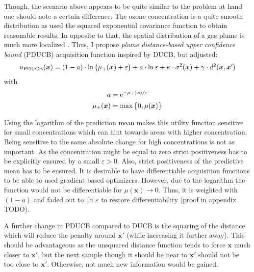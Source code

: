 \documentclass[11pt,a4paper,twoside,BCOR=15mm]{scrreprt}
\newcommand{\vc}[1]{\bm{#1}}
\newcommand{\e}{\mathrm{e}}
\newcommand{\ped}[1]{_{\mathrm{#1}}}
\newcommand{\newterm}[1]{\emph{#1}}
\begin{document}
Though, the scenario above appears to be quite similar to the problem at hand 
one should note a certain difference. The ozone concentration is a quite smooth 
distribution as \textcite{Marchant:2012wb} used the squared exponential 
covariance function to obtain reasonable results. In opposite to that, the 
spatial distribution of a gas plume is much more localized \parencite[][this was 
also noted by]{Stachniss:2008vz}. Thus, I propose \newterm{plume distance-based 
    upper confidence bound} (PDUCB) acquisition function inspired by DUCB, but 
adjusted:
\begin{equation}
    u\ped{PDUCB}(\vc x) = \del{1 - a} \cdot \ln\del{\mu_+(\vc x) + \varepsilon} 
    + a \cdot \ln \varepsilon + \kappa \cdot \sigma^2(\vc x) + \gamma \cdot 
    d^2(\vc x, \vc x')
\end{equation}
with
\begin{align}
    a &= \e^{-\mu_+(\vc x) / \varepsilon} \\
    \mu_+(\vc x) &= \max\cbr{0, \mu(\vc x)}
\end{align}

Using the logarithm of the prediction mean makes this utility function sensitive 
for small concentrations which can hint towards areas with higher concentration.  
Being sensitive to the same absolute change for high concentrations is not as 
important. As the concentration might be equal to zero strict positiveness has 
to be explicitly ensured by a small $\varepsilon > 0$. Also, strict positiveness 
of the predictive mean has to be ensured. It is desirable to have differentiable 
acquisition functions to be able to used gradient based optimizers. However, due 
to the logarithm the function would not be differentiable for $\mu(\vc x) 
\rightarrow 0$. Thus, it is weighted with $(1 - a)$ and faded out to $\ln 
\varepsilon$ to restore differentiability (proof in appendix TODO).

A further change in PDUCB compared to DUCB is the squaring of the distance which 
will reduce the penalty around $\vc x'$ (while increasing it further away).  
This should be advantageous as the unsquared distance function tends to force 
$\vc x$ much closer to $\vc x'$, but the next sample though it should be near to 
$\vc x'$ should not be too close to $\vc x'$.  Otherwise, not much new 
information would be gained.
\end{document}
